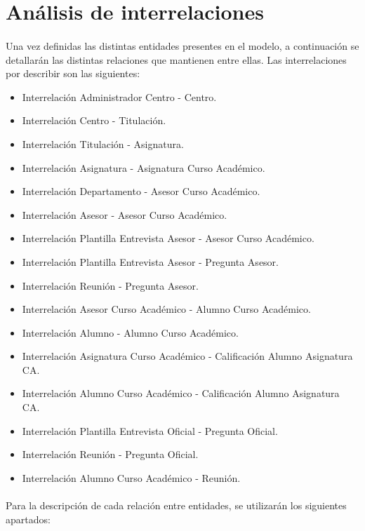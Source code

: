 \section{Análisis de interrelaciones}

   \paragraph{}Una vez definidas las distintas entidades presentes en el
   modelo, a continuación se detallarán las distintas relaciones que mantienen
   entre ellas. Las interrelaciones por describir son las siguientes:

   \begin{itemize}
    \item Interrelación Administrador Centro - Centro.
    \item Interrelación Centro - Titulación.
    \item Interrelación Titulación - Asignatura.
    \item Interrelación Asignatura - Asignatura Curso Académico.
    \item Interrelación Departamento - Asesor Curso Académico.
    \item Interrelación Asesor - Asesor Curso Académico.
    \item Interrelación Plantilla Entrevista Asesor - Asesor Curso Académico.
    \item Interrelación Plantilla Entrevista Asesor - Pregunta Asesor.
    \item Interrelación Reunión - Pregunta Asesor.
    \item Interrelación Asesor Curso Académico - Alumno Curso Académico.
    \item Interrelación Alumno - Alumno Curso Académico.
    \item Interrelación Asignatura Curso Académico - Calificación Alumno Asignatura CA.
    \item Interrelación Alumno Curso Académico - Calificación Alumno Asignatura CA.
    \item Interrelación Plantilla Entrevista Oficial - Pregunta Oficial.
    \item Interrelación Reunión - Pregunta Oficial.
    \item Interrelación Alumno Curso Académico - Reunión.
   \end{itemize}

   \paragraph{}Para la descripción de cada relación entre entidades, se
   utilizarán los siguientes apartados:

